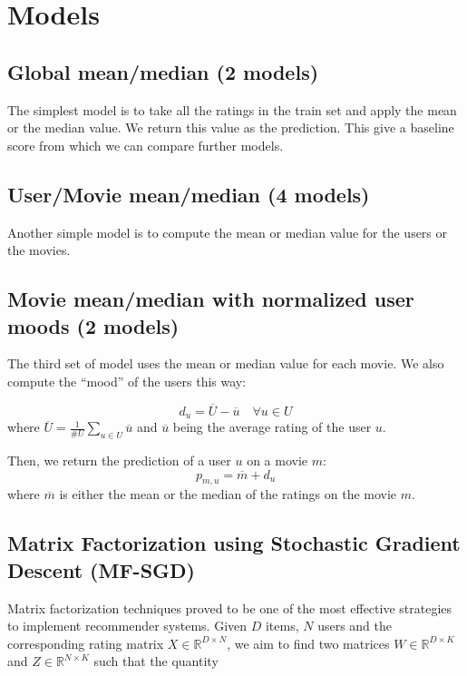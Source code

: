 \documentclass[10pt,conference,compsocconf]{IEEEtran}
\begin{document}
\section{Models}

\subsection{Global mean/median (2 models)}

The simplest model is to take all the ratings in the train set and apply the mean or the median value. We return this value as the prediction. This give a baseline score from which we can compare further models.

\subsection{User/Movie mean/median (4 models)}

Another simple model is to compute the mean or median value for the users or the movies.

\subsection{Movie mean/median with normalized user moods (2 models)}

The third set of model uses the mean or median value for each movie. We also compute the ``mood'' of the users this way:

\begin{equation}
 d_u = \overline{U} - \overline{u} \quad \forall u\in U
\end{equation}
where $\overline{U} = \frac{1}{\#U} \sum_{u\in U} \overline{u}$ and $\overline{u}$ being the average rating of the user $u$.

Then, we return the prediction of a user $u$ on a movie $m$:
\begin{equation}
 p_{m,u} = \overline{m} + d_u
\end{equation}
where $\overline{m}$ is either the mean or the median of the ratings on the movie $m$.

\subsection{Matrix Factorization using Stochastic Gradient Descent (MF-SGD)}
\label{sec:mf-sgd}
Matrix factorization techniques proved to be one of the most effective strategies to implement 
recommender systems. Given $D$ items, $N$ users and the corresponding rating matrix 
$X \in \mathbb{R}^{D \times N}$, we aim to find two matrices $W \in \mathbb{R}^{D \times K}$ and $Z
\in \mathbb{R}^{N \times K}$ such that the quantity 
\end{document}
